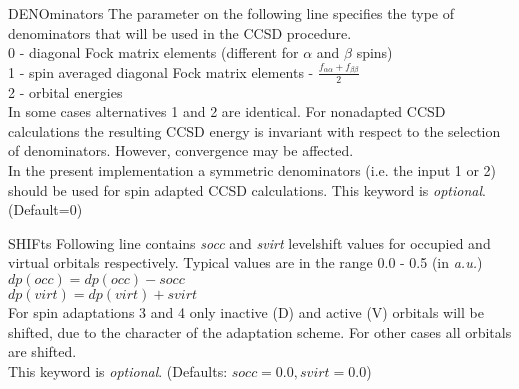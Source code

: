 \begin{keywordlist}
\item[DENOminators]
The parameter on the following line specifies the type of denominators that
will be used in the CCSD procedure.\\
0 - diagonal Fock matrix elements (different for ${\alpha}$ and ${\beta}$
spins)\\
1 - spin averaged diagonal Fock matrix elements  -
${\frac{f_{\alpha\alpha}+f_{\beta\beta}}{2}}$\\
2 - orbital energies \\
In some cases alternatives 1 and 2 are identical.
For nonadapted CCSD calculations the resulting CCSD energy
is invariant with respect to the selection of denominators.
However, convergence may be affected.\\
In the present implementation a symmetric denominators
(i.e. the input 1 or 2) should be used for spin adapted CCSD calculations.
This keyword is {\it optional}. (Default=0)
\item[SHIFts]
Following line contains {\it socc} and {\it svirt} levelshift values for occupied and
virtual orbitals respectively. Typical values are in the range 0.0 - 0.5 (in {\it a.u.})\\
${dp(occ)=dp(occ)-socc}$ \\
${dp(virt)=dp(virt)+svirt}$\\
For spin adaptations 3 and 4 only inactive (D) and active (V) orbitals
will be shifted, due to the character of the adaptation scheme. For other cases all
orbitals are shifted.\\
This keyword is {\it optional}. (Defaults: ${socc=0.0, svirt=0.0}$)

\end{keywordlist}
